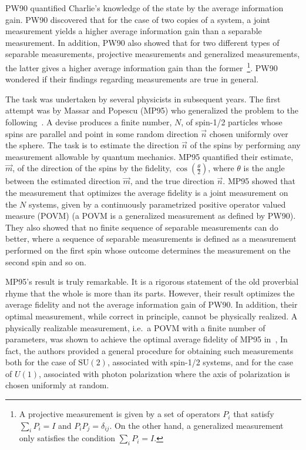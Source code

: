 PW90 quantified Charlie's knowledge of the state by the average information gain. PW90 discovered that for the case of two copies of a system, a joint measurement yields a higher average information gain than a separable measurement.  In addition, PW90 also showed that for two different types of separable measurements, projective measurements and generalized measurements, the latter gives a higher average information gain than the former~\footnote{A projective measurement is given by a set of operators  $P_i$ that satisfy $\sum_i P_i=I$ and $P_iP_j=\delta_{ij}$.  On the other hand, a generalized measurement only satisfies the condition $\sum_i P_i=I$.}. PW90 wondered if their findings regarding measurements are true in general.

The task was undertaken by several physicists in subsequent years.  The first attempt was by Massar and Popescu (MP95) who generalized the problem to the following~\cite{MP95}.  A devise produces a finite number, $N$, of spin-1/2 particles whose spins are parallel and point in some random direction $\vec{n}$ chosen uniformly over the sphere. The task is to estimate the direction $\vec{n}$ of the spins by performing any measurement allowable by quantum mechanics.  MP95 quantified their estimate, $\vec{m}$, of the direction of the spins by the fidelity, $\cos\left(\frac{\theta}{2}\right)$, where $\theta$ is the angle between the estimated direction $\vec{m}$, and the true direction $\vec{n}$.  MP95 showed that the measurement that optimizes the average fidelity is a joint measurement on the $N$ systems, given by a continuously parametrized positive operator valued measure (POVM) (a POVM is a generalized measurement as defined by PW90).  They also showed that no finite sequence of separable measurements can do better, where a sequence of separable measurements is defined as a measurement performed on the first spin whose outcome determines the measurement on the second spin and so on. 

MP95's result is truly remarkable. It is a rigorous statement of the old proverbial rhyme that the whole is more than its parts.  However, their result optimizes the average fidelity and not the average information gain of PW90. In addition, their optimal measurement, while correct in principle, cannot be physically realized.  A physically realizable measurement, i.e.~a POVM with a finite number of parameters, was shown to achieve the optimal average fidelity of MP95 in~\cite{DBE98},  In fact, the authors provided a general procedure for obtaining such measurements both for the case of $\mathrm{SU}(2)$, associated with spin-1/2 systems, and for the case of $U(1)$, associated with photon polarization where the axis of polarization is chosen uniformly at random.  


